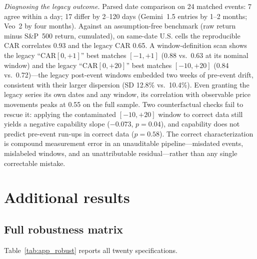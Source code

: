 \documentclass[review,12pt,authoryear]{elsarticle}
\begin{document}
\emph{Diagnosing the legacy outcome.} Parsed date comparison on 24 matched
events: 7 agree within a day; 17 differ by 2--120 days (Gemini~1.5 entries by
1--2 months; Veo~2 by four months). Against an assumption-free benchmark
(raw return minus S\&P~500 return, cumulated), on same-date U.S. cells the
reproducible CAR correlates 0.93 and the legacy CAR 0.65. A window-definition
scan shows the legacy ``CAR$[0,+1]$'' best matches $[-1,+1]$ (0.88 vs.\ 0.63
at its nominal window) and the legacy ``CAR$[0,+20]$'' best matches
$[-10,+20]$ (0.84 vs.\ 0.72)---the legacy post-event windows embedded two
weeks of pre-event drift, consistent with their larger dispersion (SD 12.8\%
vs.\ 10.4\%). Even granting the legacy series its own dates and any window,
its correlation with observable price movements peaks at 0.55 on the full
sample. Two counterfactual checks fail to rescue it: applying the
contaminated $[-10,+20]$ window to correct data still yields a negative
capability slope ($-0.073$, $p=0.04$), and capability does not predict
pre-event run-ups in correct data ($p=0.58$). The correct characterization
is compound measurement error in an unauditable pipeline---misdated events,
mislabeled windows, and an unattributable residual---rather than any single
correctable mistake.

\section{Additional results}\label{app:results}

\subsection{Full robustness matrix}
Table~\ref{tab:app_robust} reports all twenty specifications.
\end{document}
